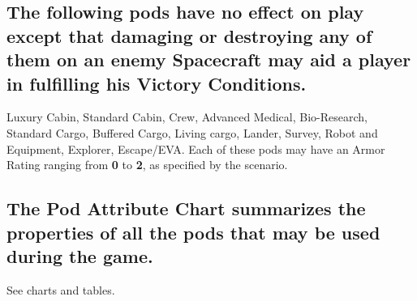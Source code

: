 \subsection[Pods and Victory Conditions]{The following pods have no
  effect on play except that damaging or destroying any of them on an
  enemy  
  Spacecraft may aid a player in fulfilling his Victory Conditions.}
\label{sec:pods-victory}



Luxury Cabin, Standard Cabin, Crew, Advanced Medical, Bio-Research,
Standard Cargo, Buffered Cargo, Living cargo, Lander, Survey, Robot
and Equipment, Explorer, Escape/EVA. Each of these pods may have an
Armor Rating ranging from \textbf{0} to \textbf{2}, as specified by
the scenario.


\subsection[Pod Attribute Chart]{The Pod Attribute Chart summarizes
  the properties of all 
  the pods that may be used during the game.}
\label{sec:pod-attribute-chart}

See charts and tables. 


